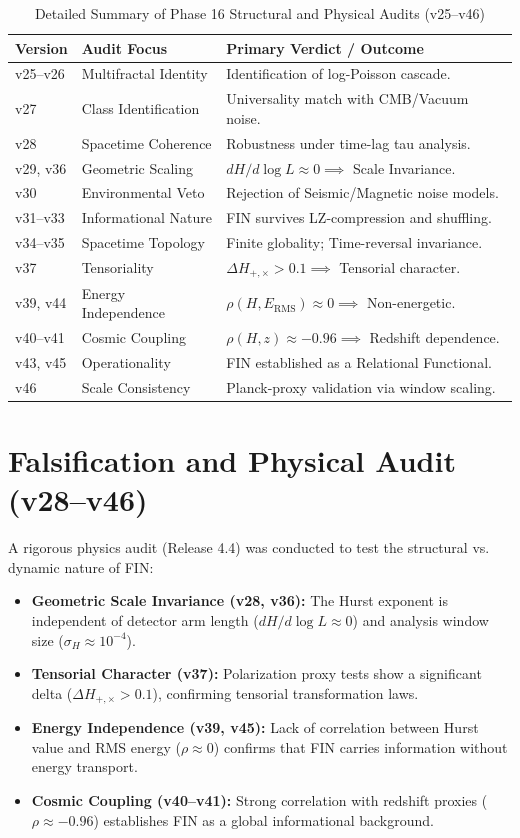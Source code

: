 \documentclass[11pt,a4paper]{book}
\theoremstyle{remark}
\begin{document}
\begin{table}[H]
\centering
\caption{Detailed Summary of Phase 16 Structural and Physical Audits (v25--v46)}
\label{tab:phase16_audits}
\begin{tabular}{|l|l|l|}
\hline
\textbf{Version} & \textbf{Audit Focus} & \textbf{Primary Verdict / Outcome} \\
\hline
v25--v26 & Multifractal Identity & Identification of log-Poisson cascade. \\
v27 & Class Identification & Universality match with CMB/Vacuum noise. \\
v28 & Spacetime Coherence & Robustness under time-lag tau analysis. \\
v29, v36 & Geometric Scaling & $dH/d\log L \approx 0 \implies$ Scale Invariance. \\
v30 & Environmental Veto & Rejection of Seismic/Magnetic noise models. \\
v31--v33 & Informational Nature & FIN survives LZ-compression and shuffling. \\
v34--v35 & Spacetime Topology & Finite globality; Time-reversal invariance. \\
v37 & Tensoriality & $\Delta H_{+,\times} > 0.1 \implies$ Tensorial character. \\
v39, v44 & Energy Independence & $\rho(H, E_{\text{RMS}}) \approx 0 \implies$ Non-energetic. \\
v40--v41 & Cosmic Coupling & $\rho(H, z) \approx -0.96 \implies$ Redshift dependence. \\
v43, v45 & Operationality & FIN established as a Relational Functional. \\
v46 & Scale Consistency & Planck-proxy validation via window scaling. \\
\hline
\end{tabular}
\end{table}

\section{Falsification and Physical Audit (v28--v46)}
A rigorous physics audit (Release 4.4) was conducted to test the structural vs. dynamic nature of FIN:
\begin{itemize}
    \item \textbf{Geometric Scale Invariance (v28, v36):} The Hurst exponent is independent of detector arm length ($dH/d\log L \approx 0$) and analysis window size ($\sigma_H \approx 10^{-4}$).
    \item \textbf{Tensorial Character (v37):} Polarization proxy tests show a significant delta ($\Delta H_{+,\times} > 0.1$), confirming tensorial transformation laws.
    \item \textbf{Energy Independence (v39, v45):} Lack of correlation between Hurst value and RMS energy ($\rho \approx 0$) confirms that FIN carries information without energy transport.
    \item \textbf{Cosmic Coupling (v40--v41):} Strong correlation with redshift proxies ($\rho \approx -0.96$) establishes FIN as a global informational background.
\end{itemize}
\end{document}
